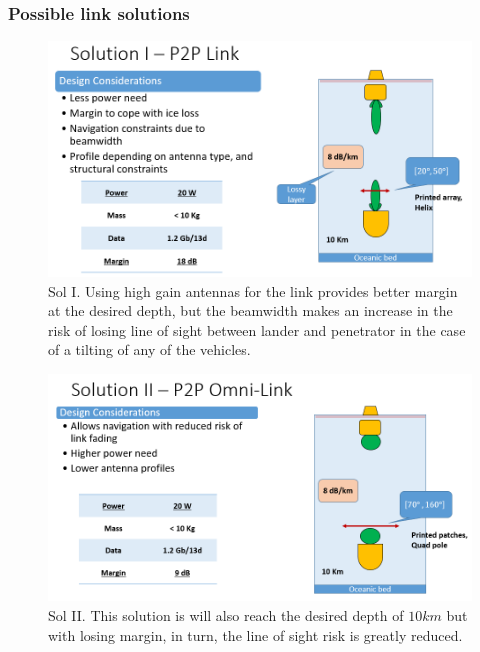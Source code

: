 \subsubsection{Possible link solutions}
\begin{figure}[htb]
	\centering
	\includegraphics[width=\textwidth]{figures/comms/iceLink-p2p-HighD}
	\caption{Sol I. Using high gain antennas for the link provides better margin at the desired depth, but the beamwidth makes an increase in the risk of losing line of sight between lander and penetrator in the case of a tilting of any of the vehicles.}
	\label{fig:iceLink-p2p-HighD}
\end{figure}
\begin{figure}[htb]
	\centering
	\includegraphics[width=\textwidth]{figures/comms/iceLink-p2p-LowD}
	\caption{Sol II. This solution is will also reach the desired depth of $10km$ but with losing margin, in turn, the line of sight risk is greatly reduced.}
	\label{fig:iceLink-p2p-LowD}
\end{figure}


